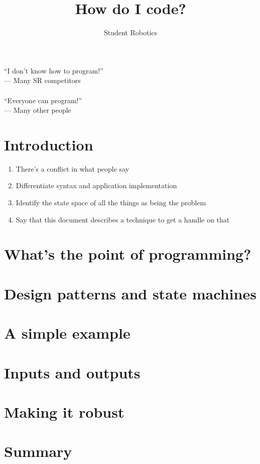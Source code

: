 \documentclass[a4paper,10pt]{article}
\title{How do I code?}
\author{Student Robotics}
\begin{document}
\maketitle

\hfill ``I don't know how to program!''\\
\hphantom{fgasdf}\hfill --- Many SR competitors\\
\\
``Everyone can program!''\\
--- Many other people\\

\section{Introduction}

\begin{enumerate}
\item There's a conflict in what people say
\item Differentiate syntax and application implementation
\item Identify the state space of all the things as being the problem
\item Say that this document describes a technique to get a handle on that
\end{enumerate}

\section{What's the point of programming?}
\section{Design patterns and state machines}
\section{A simple example}
\section{Inputs and outputs}
\section{Making it robust}
\section{Summary}
\end{document}
